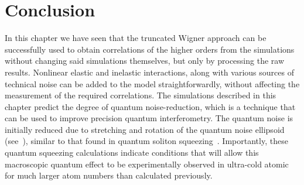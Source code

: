 \section{Conclusion}

In this chapter we have seen that the truncated Wigner approach can be successfully used to obtain correlations of the higher orders from the simulations without changing said simulations themselves, but only by processing the raw results.
Nonlinear elastic and inelastic interactions, along with various sources of technical noise can be added to the model straightforwardly, without affecting the measurement of the required correlations.
The simulations described in this chapter predict the degree of quantum noise-reduction, which is a technique that can be used to improve precision quantum interferometry.
The quantum noise is initially reduced due to stretching and rotation of the quantum noise ellipsoid (see~), similar to that found in quantum soliton squeezing~\cite{Carter1987,Drummond1993a}.
Importantly, these quantum squeezing calculations indicate conditions that will allow this macroscopic quantum effect to be experimentally observed in ultra-cold atomic  for much larger atom numbers than calculated previously.
